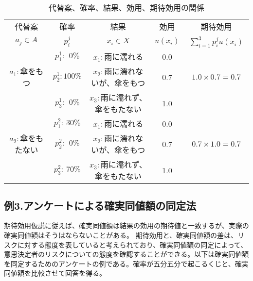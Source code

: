 \documentclass[a4j,12pt]{jsarticle}
\begin{document}
\begin{table}[b]

\begin{center}
\begin{tabular}{ccccc} 																								\toprule
	代替案		 	& 確率		& 結果 							& 効用 				& 期待効用					　	\\ 
	$a_j\in A$			 	& $p_i^j$		& $x_i \in X$ 							& $u(x_i)$ 			& $\displaystyle \sum_{i=1}^3 p_i^j u(x_i)$　	\\ 	\midrule
					& $p_1^1:\ \ 0\%$  		& $x_1:$雨に濡れる 					& 0.0 				& 							\\ 		
	$a_1:$傘をもつ 	& $p_2^1:100\%$ 	& $x_2:$雨に濡れないが、傘をもつ 		& 0.7				& $1.0\times0.7=0.7$			\\ 				
					& $p_3^1:\ \ 0\%$  		& $x_3:$雨に濡れず、傘をもたない 		& 1.0 				& 							\\	\midrule
					& $p_1^2:\ 30\%$  		& $x_1:$雨に濡れる 					& 0.0 				& 							\\ 		
	$a_2:$傘をもたない 	& $p_2^2:\ \ 0\%$ 		& $x_2:$雨に濡れないが、傘をもつ 		& 0.7 				& $0.7\times1.0=0.7$			\\ 		
					& $p_3^2:\ 70\%$  		& $x_3:$雨に濡れず、傘をもたない 		& 1.0 				& 							\\	\bottomrule\end{tabular}
\end{center}
\caption{代替案、確率、結果、効用、期待効用の関係}
\end{table}


\subsection{例3.アンケートによる確実同値額の同定法}
期待効用仮説に従えば、確実同値額は結果の効用の期待値と一致するが、実際の確実同値額はそうはならないことがある。
期待効用と、確実同値額の差は、リスクに対する態度を表していると考えられており、確実同値額の同定によって、意思決定者のリスクについての態度を確認することができる。以下は確実同値額を同定するためのアンケートの例である。確率が五分五分で起こるくじと、確実同値額を比較させて回答を得る。
\end{document}
